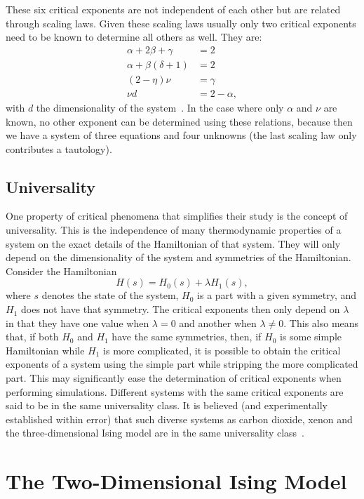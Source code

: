 \documentclass[11pt, a4paper]{report} %
\begin{document}
These six critical exponents are not independent of each other but are related through scaling laws.
Given these scaling laws usually only two critical exponents need to be known to determine all others as well.
They are:
\begin{align}
	\alpha + 2\beta +\gamma &= 2\\
	\alpha + \beta(\delta+1) &= 2\\
	(2-\eta)\nu &= \gamma \\
	\nu d &= 2- \alpha,
\end{align}
with \(d\) the dimensionality of the system~\cite{binney:1992,baxter:1989,landau:2015}.
In the case where only \(\alpha\) and \(\nu\) are known, no other exponent can be determined using these relations, because then we have a system of three equations and four unknowns (the last scaling law only contributes a tautology).


\subsection{Universality}
One property of critical phenomena that simplifies their study is the concept of universality.
This is the independence of many thermodynamic properties of a system on the exact details of the Hamiltonian of that system.
They will only depend on the dimensionality of the system and symmetries of the Hamiltonian.
Consider the Hamiltonian
\begin{equation}
	H(s) = H_0(s) + \lambda H_1(s),
\end{equation}
where \(s\) denotes the state of the system, \(H_0\) is a part with a given symmetry, and \(H_1\) does not have that symmetry.
The critical exponents then only depend on \(\lambda\) in that they have one value when \(\lambda=0\) and another when \(\lambda \neq 0\).
This also means that, if both \(H_0\) and \(H_1\) have the same symmetries, then, if \(H_0\) is some simple Hamiltonian while \(H_1\) is more complicated, it is possible to obtain the critical exponents of a system using the simple part while stripping the more complicated part.
This may significantly ease the determination of critical exponents when performing simulations.
Different systems with the same critical exponents are said to be in the same universality class.
It is believed (and experimentally established within error) that such diverse systems as carbon dioxide, xenon and the three-dimensional Ising model are in the same universality class~\cite{baxter:1989}.

\section{The Two-Dimensional Ising Model}\label{sec:ising_model}
\end{document}
